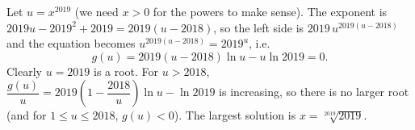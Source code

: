Let $u=x^{2019}$ (we need $x>0$ for the powers to make sense). The exponent is $2019u-2019^2+2019=2019(u-2018)$, so the left side is $2019\,u^{2019(u-2018)}$ and the equation becomes $u^{2019(u-2018)}=2019^u$, i.e.
\[g(u)=2019(u-2018)\ln u-u\ln2019=0.\]
Clearly $u=2019$ is a root. For $u>2018$, $\dfrac{g(u)}u=2019\left(1-\dfrac{2018}u\right)\ln u-\ln2019$ is increasing, so there is no larger root (and for $1\le u\le2018$, $g(u)<0$). The largest solution is $x=\boxed{\sqrt[2019]{2019}}$.

